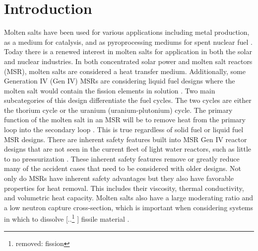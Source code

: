 \documentclass[review]{elsarticle}
\providecommand{\DIFaddtex}[1]{{\protect\color{blue} \sf #1}} %
\providecommand{\DIFdeltex}[1]{{\protect\color{red} [..\footnote{removed: #1} ]}} %
\providecommand{\DIFaddbegin}{} %
\providecommand{\DIFaddend}{} %
\providecommand{\DIFdelbegin}{} %
\providecommand{\DIFdelend}{} %
\providecommand{\DIFadd}[1]{\texorpdfstring{\DIFaddtex{#1}}{#1}} %
\providecommand{\DIFdel}[1]{\texorpdfstring{\DIFdeltex{#1}}{}} %
\newcommand{\DIFscaledelfig}{0.5}
\newlength{\DIFdelgraphicswidth} %
\newlength{\DIFdelgraphicsheight} %
\newcommand{\DIFaddincludegraphics}[2][]{{\color{blue}\fbox{\DIFOincludegraphics[#1]{#2}}}} %
\newcommand{\DIFdelincludegraphics}[2][]{%
\sbox{\DIFdelgraphicsbox}{\DIFOincludegraphics[#1]{#2}}%
\settoboxwidth{\DIFdelgraphicswidth}{\DIFdelgraphicsbox} %
\settoboxtotalheight{\DIFdelgraphicsheight}{\DIFdelgraphicsbox} %
\scalebox{\DIFscaledelfig}{%
\parbox[b]{\DIFdelgraphicswidth}{\usebox{\DIFdelgraphicsbox}\\[-\baselineskip] \rule{\DIFdelgraphicswidth}{0em}}\llap{\resizebox{\DIFdelgraphicswidth}{\DIFdelgraphicsheight}{%
\setlength{\unitlength}{\DIFdelgraphicswidth}%
\begin{picture}(1,1)%
\thicklines\linethickness{2pt} %
{\color[rgb]{1,0,0}\put(0,0){\framebox(1,1){}}}%
{\color[rgb]{1,0,0}\put(0,0){\line( 1,1){1}}}%
{\color[rgb]{1,0,0}\put(0,1){\line(1,-1){1}}}%
\end{picture}%
}\hspace*{3pt}}} %
} %
\DeclareRobustCommand{\DIFaddbegin}{\DIFOaddbegin \let\includegraphics\DIFaddincludegraphics} %
\DeclareRobustCommand{\DIFaddend}{\DIFOaddend \let\includegraphics\DIFOincludegraphics} %
\DeclareRobustCommand{\DIFdelbegin}{\DIFOdelbegin \let\includegraphics\DIFdelincludegraphics} %
\DeclareRobustCommand{\DIFdelend}{\DIFOaddend \let\includegraphics\DIFOincludegraphics} %
\begin{document}

\section{Introduction}
Molten salts have been used for various applications including metal production\cite{Zhu2014, VAHIDI2018178}, as a medium for catalysis\cite{JIN20202382, HU20204244}, and as pyroprocessing mediums for spent nuclear fuel \cite{CHOI2015572, osti_22107867}. Today there is a renewed interest in molten salts for application in both the solar and nuclear industries. In both concentrated solar power and molten salt reactors (MSR), molten salts are considered a heat transfer medium. Additionally, some Generation IV (Gen IV) MSRs are considering liquid fuel designs where the molten salt would contain the fission elements in solution \cite{doi:10.1080/00295450.2019.1586372}. Two main subcategories of this design differentiate the fuel cycles. The two cycles are either the thorium cycle or the uranium (uranium-plutonium) cycle. The primary function of the molten salt in an MSR will be to remove heat from the primary loop into the secondary loop \cite{gakhar2021molten}. This is true regardless of solid fuel or liquid fuel MSR designs. There are inherent safety features built into MSR Gen IV reactor designs that are not seen in the current fleet of light water reactors, such as little to no pressurization \cite{leblanc2017integral}. These inherent safety features remove or greatly reduce many of the accident cases that need to be considered with older designs. Not only do MSRs have inherent safety advantages but they also have favorable properties for heat removal. This includes their viscosity, thermal conductivity, and volumetric heat capacity. Molten salts also have a large moderating ratio and a low neutron capture cross-section, which is important when considering systems in which to dissolve \DIFdelbegin \DIFdel{fission }\DIFdelend \DIFaddbegin \DIFadd{fissile }\DIFaddend material \cite{williams2006assessment}.
\end{document}
